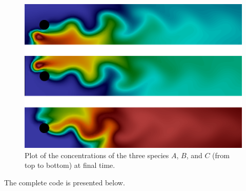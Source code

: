 \documentclass[graybox,envcountchap,sectrefs,final]{svmonodo}
\begin{document}
\begin{figure}[!ht]  %
  \centerline{\includegraphics[width=0.95\linewidth]{fig/reaction_system.png}}
  \caption{
  Plot of the concentrations of the three species $A$, $B$, and $C$ (from top to bottom) at final time. \label{ftut1:fig:reactionsystem:solution}
  }
\end{figure}


The complete code is presented below.
\end{document}

